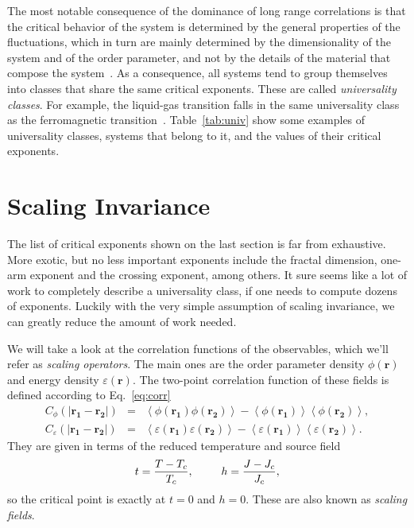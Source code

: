 

The most notable consequence of the dominance of long range correlations is
that the critical behavior of the system is determined by the general
properties of the fluctuations, which in turn are mainly determined by the
dimensionality of the system and of the order parameter, and not by the details
of the material that compose the system~\cite{Stanley1999}. As a consequence,
all systems tend to group themselves into classes that share the same critical
exponents. These are called \textit{universality classes}. For example, the
liquid-gas transition falls in the same universality class as the ferromagnetic
transition~\cite{Kim1984}. Table~\ref{tab:univ} show some examples of
universality classes, systems that belong to it, and the values of their
critical exponents.


\section{Scaling Invariance}
\label{sec:scaling}
\renewcommand{\op}{\phi}

The list of critical exponents shown on the last section is far from
exhaustive. More exotic, but no less important exponents include the fractal
dimension, one-arm exponent and the crossing exponent, among others. It sure
seems like a lot of work to completely describe a universality class, if one
needs to compute dozens of exponents. Luckily with the very simple assumption
of scaling invariance, we can greatly reduce the amount of work needed.

We will take a look at the correlation functions of the observables, which
we'll refer as \textit{scaling operators}. The main ones are the order
parameter density $\op(\mathbf{r})$ and energy density
$\varepsilon(\mathbf{r})$. The two-point correlation function of these fields is
defined according to Eq.~\ref{eq:corr}
\begin{eqnarray}
    \label{eq:corr10}
    C_{\op}\left(\left|\mathbf{r_1}-\mathbf{r_2}\right|\right) & = &
    \left\langle
        \op\left(\mathbf{r_{1}}\right)
        \op\left(\mathbf{r_{2}}\right)
    \right\rangle -
    \left\langle
        \op\left(\mathbf{r_{1}}\right)
    \right\rangle
    \left\langle
        \op\left(\mathbf{r_{2}}\right)
    \right\rangle,
    \\
    \label{eq:corr11}
    C_{\varepsilon}\left(\left|\mathbf{r_1}-\mathbf{r_2}\right|\right) & = &
    \left\langle
        \varepsilon\left(\mathbf{r_{1}}\right)
        \varepsilon\left(\mathbf{r_{2}}\right)
    \right\rangle-
    \left\langle
        \varepsilon\left(\mathbf{r_{1}}\right)
    \right\rangle
    \left\langle
        \varepsilon\left(\mathbf{r_{2}}\right)
    \right\rangle.
\end{eqnarray}
They are given in terms of the reduced temperature and source field
\begin{equation}
    t=\frac{T-T_c}{T_c},\;\;\;\;\;\;\;\;\;h=\frac{J-J_c}{J_c},
\end{equation}
so the critical point is exactly at $t=0$ and $h=0$. These are also known
as \textit{scaling fields}.

